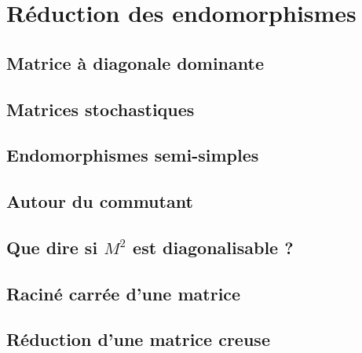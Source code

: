 \chapter{Réduction des endomorphismes}



\newpage

\section{Matrice à diagonale dominante}


\section{Matrices stochastiques}


\section{Endomorphismes semi-simples}


\section{Autour du commutant}


\section{Que dire si \texorpdfstring{$M^2$}{M^2} est diagonalisable ?}


\section{Raciné carrée d'une matrice}


\section{Réduction d'une matrice creuse}


